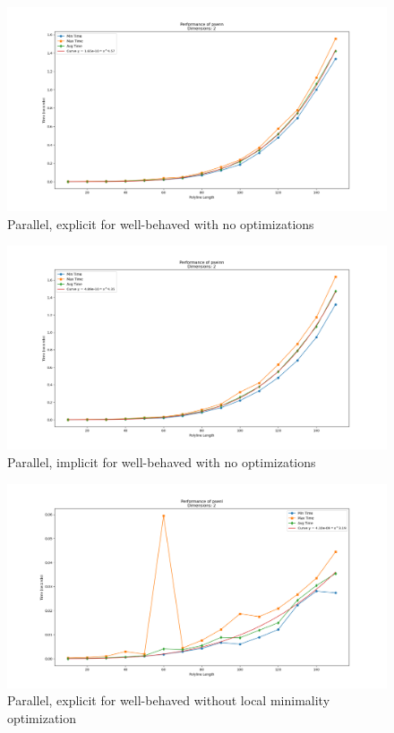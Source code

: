 \begin{figure}[ht]
  \centering
  \includegraphics[scale=0.5, width=\linewidth]{figures/psenn.png}
  \caption{Parallel, explicit for well-behaved with no optimizations}
  \label{fig:psenn}
\end{figure}

\begin{figure}[ht]
  \centering
  \includegraphics[scale=0.5, width=\linewidth]{figures/pseinn.png}
  \caption{Parallel, implicit for well-behaved with no optimizations}
  \label{fig:pseinn}
\end{figure}

\begin{figure}[ht]
  \centering
  \includegraphics[scale=0.5, width=\linewidth]{figures/psenl.png}
  \caption{Parallel, explicit for well-behaved without local minimality optimization}
  \label{fig:psenl}
\end{figure}

